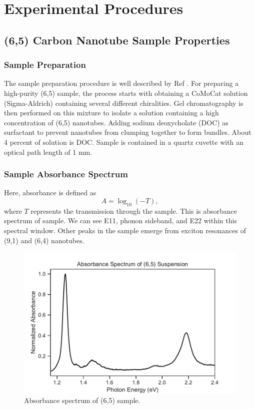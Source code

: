 \chapter{Experimental Procedures}

\section{(6,5) Carbon Nanotube Sample Properties}

\subsection{Sample Preparation}
The sample preparation procedure is well described by Ref \cite{ichinose2017extraction}. For preparing a high-purity (6,5) sample, the process starts with obtaining a CoMoCat solution (Sigma-Aldrich) containing several different chiralities. Gel chromatography is then performed on this mixture to isolate a solution containing a high concentration of (6,5) nanotubes. Adding sodium deoxycholate (DOC) as surfactant to prevent nanotubes from clumping together to form bundles. About 4 percent of solution is DOC. Sample is contained in a quartz cuvette with an optical path length of 1 mm.

\subsection{Sample Absorbance Spectrum}

Here, absorbance is defined as 
\begin{equation}
A = \log_{10}(-T),
\end{equation}
where $T$ represents the transmission through the sample. 
This is absorbance spectrum of sample. We can see E11, phonon sideband, and E22 within this spectral window. Other peaks in the sample emerge from exciton resonances of (9,1) and (6,4) nanotubes.

\begin{figure}[H]
	\centering
	\includegraphics[scale=0.7]{images/chapter_methods/sample_absorbance}
	\caption{ Absorbance spectrum of (6,5) sample.}
	\label{fig:sample_absorbance}
\end{figure}

